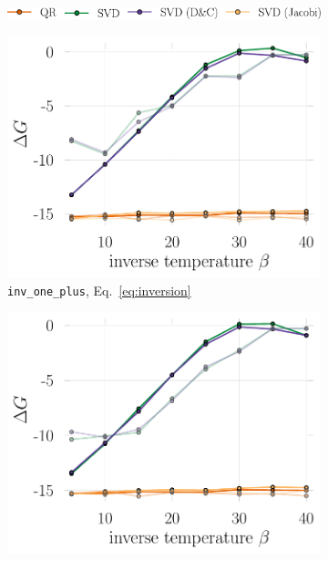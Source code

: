 \documentclass[submission, Phys]{SciPost}
\begin{document}
\begin{figure}
	\centering
	\begin{subfigure}{0.98\textwidth}
		\centering
		\includegraphics[width=.65\textwidth]{figures/legend.pdf}
		\vspace{5pt}
	\end{subfigure}
	\begin{subfigure}{0.48\textwidth}
	\includegraphics[width=\textwidth]{figures/accuracy_greens_svd_regularinv.pdf}
\caption{\texttt{inv\_one\_plus}, Eq.~\eqref{eq:inversion} \label{fig:greens_accuracy_regularinv}}
	\end{subfigure}%
	\hspace{10pt}
	\begin{subfigure}{0.48\textwidth}
	\includegraphics[width=\textwidth]{figures/accuracy_greens_svd_loh.pdf}

\end{subfigure}
\end{figure}
\end{document}
